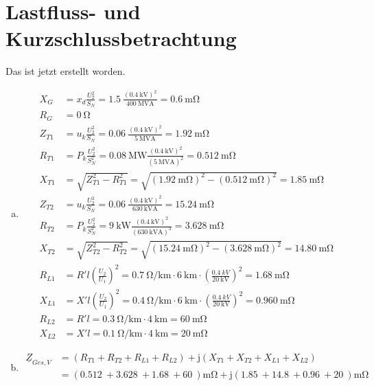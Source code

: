 ﻿\documentclass[a4paper,11pt]{scrartcl}
\newcommand{\mybr}[1]{\left(#1\right)}
\renewcommand{\j}{\mathrm{j}}
\newcommand{\Z}{\underline{Z}}
\newcommand{\0}{_{\mybr{0}}}
\newcommand{\1}{_{\mybr{1}}}
\newcommand{\2}{_{\mybr{2}}}
\begin{document}
\section{Lastfluss- und Kurzschlussbetrachtung}
Das ist jetzt erstellt worden.
\begin{enumerate}[a)]
\item
\begin{align}
X_G&=x_d\frac{U_2^2}{S_N}=\SI{1,5}{}\frac{\mybr{\SI{0,4}{\kilo\volt}}^2}{\SI{400}{\mega\volt\ampere}}=\SI{0,6}{\milli\ohm}\\
R_G&=\SI{0}{\ohm}\\
Z_{T1}&=u_k\frac{U_2^2}{S_N}=\SI{0,06}{}\frac{\mybr{\SI{0,4}{\kilo\volt}}^2}{\SI{5}{\mega\volt\ampere}}=\SI{1,92}{\milli\ohm}\\
R_{T1}&=P_k\frac{U_2^2}{S_N^2}=\SI{0,08}{\mega\watt}\frac{\mybr{\SI{0,4}{\kilo\volt}}^2}{\mybr{\SI{5}{\mega\volt\ampere}}^2}=\SI{0,512}{\milli\ohm}\\
X_{T1}&=\sqrt{Z_{T1}^2-R_{T1}^2}=\sqrt{\mybr{\SI{1,92}{\milli\ohm}}^2-\mybr{\SI{0,512}{\milli\ohm}}^2}=\SI{1,85}{\milli\ohm}\\
Z_{T2}&=u_k\frac{U_2^2}{S_N}=\SI{0,06}{}\frac{\mybr{\SI{0,4}{\kilo\volt}}^2}{\SI{630}{\kilo\volt\ampere}}=\SI{15,24}{\milli\ohm}\\
R_{T2}&=P_k\frac{U_2^2}{S_N^2}=\SI{9}{\kilo\watt}\frac{\mybr{\SI{0,4}{\kilo\volt}}^2}{\mybr{\SI{630}{\kilo\volt\ampere}}^2}=\SI{3,628}{\milli\ohm}\\
X_{T2}&=\sqrt{Z_{T2}^2-R_{T2}^2}=\sqrt{\mybr{\SI{15,24}{\milli\ohm}}^2-\mybr{\SI{3,628}{\milli\ohm}}^2}=\SI{14,80}{\milli\ohm}\\
R_{L1}&=R'l\mybr{\frac{U_2}{U_1}}^2=\SI{0,7}{\ohm\per\kilo\metre}\cdot\SI{6}{\kilo\metre}\cdot\mybr{\frac{\SI{0,4}{kV}}{\SI{20}{\kilo\volt}}}^2=\SI{1,68}{\milli\ohm}\\
X_{L1}&=X'l\mybr{\frac{U_2}{U_1}}^2=\SI{0,4}{\ohm\per\kilo\metre}\cdot\SI{6}{\kilo\metre}\cdot\mybr{\frac{\SI{0,4}{kV}}{\SI{20}{\kilo\volt}}}^2=\SI{0,960}{\milli\ohm}\\
R_{L2}&=R'l=\SI{0,3}{\ohm\per\kilo\metre}\cdot\SI{4}{\kilo\metre}=\SI{60}{\milli\ohm}\\
X_{L2}&=X'l=\SI{0,1}{\ohm\per\kilo\metre}\cdot\SI{4}{\kilo\metre}=\SI{20}{\milli\ohm}
\end{align}
\item
\begin{align}
\Z_{Ges,V}&=\mybr{R_{T1}+R_{T2}+R_{L1}+R_{L2}}+\j\mybr{X_{T1}+X_{T2}+X_{L1}+X_{L2}}\\
&=\mybr{\SI{0,512}{}+\SI{3,628}{}+\SI{1,68}{}+\SI{60}{}}\si{\milli\ohm}+\j\mybr{\SI{1,85}{}+\SI{14,8}{}+\SI{0,96}{}+\SI{20}{}}\si{\milli\ohm}\\

\end{align}
\end{enumerate}
\end{document}
